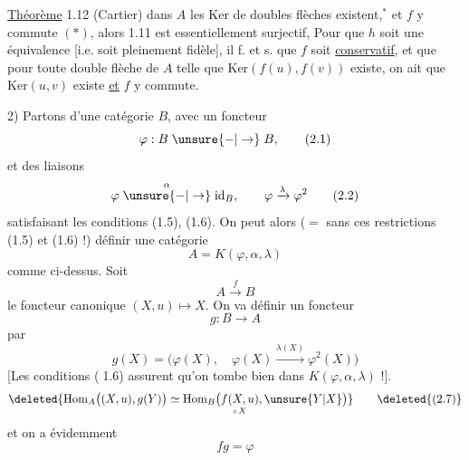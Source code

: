 \uline{Théorème} 1.12 (Cartier)   dans $A$ les $\mathrm{Ker}$ de doubles flèches existent,$^{*}$ et   $f$ y commute $(*)$, alors 1.11 est essentiellement surjectif,
  Pour que \uline{$h$} soit une équivalence [i.e. soit  pleinement fidèle], il f. et s. que $f$ soit \uline{conservatif}, et que pour toute double flèche  de $A$ telle que $\mathrm{Ker}(f(u),f(v))$ existe, on ait que $\mathrm{Ker}(u,v)$ existe \uline{et} $f$ y commute.

2) Partons d'une catégorie $B$, avec un foncteur
\[
 \varphi:B\mathrel{\unsure{-|\to}}B, \tag*{(2.1)}
\]
 et des liaisons 
\[
 \varphi\mathrel{\overset{\alpha}{\unsure{-|\to}}}\mathrm{id}_B,\qquad\varphi\xrightarrow{\lambda}\varphi^2 \tag*{(2.2)}
\]
satisfaisant les conditions (1.5), (1.6). On peut alors (\(=\) sans ces restrictions (1.5) et (1.6) !) définir une catégorie
\[
 A=K(\varphi,\alpha,\lambda) \tag*{(2.3)}
\]
comme ci-dessus. Soit
\[
 A\xrightarrow{f}B \tag*{(2.4)}
\]
le foncteur  canonique $(X,u)\longmapsto X$. On  va définir un foncteur
\[
 g:B\longrightarrow A \tag*{(2.5)}
\]
par
\[
 g(X)=\bigl(\varphi(X),\quad\varphi(X)\xrightarrow{\lambda(X)}\varphi^{2}(X)\bigr) \tag*{(2.6)}
\]
[Les conditions  \textcircled{\scriptsize (1.6)} assurent qu'on tombe bien dans $K(\varphi,\alpha,\lambda)$ !].
\[
 \deleted{\mathrm{Hom}_A\bigl((X,u),g(Y)\bigr)\simeq\mathrm{Hom}_B\bigl(\underset{\shortparallel\,X}{f(X,u)},\unsure{Y|X}\bigr)} \tag*{\deleted{(2.7)}}
\]
et on a évidemment
\[
 fg=\varphi \tag*{(2.7)}
\]
